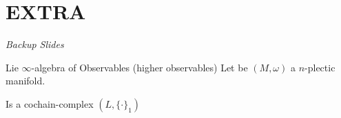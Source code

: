 \documentclass[handout,10pt]{beamer}
\begin{document}


\appendix
\section{EXTRA}
\begin{frame}
	\begin{center}
	\Huge\emph{Backup Slides}
	\end{center}
\end{frame}
\addtocounter{framenumber}{-1}



\begin{frame}[fragile]{Lie $\infty$-algebra of Observables (higher observables) }
	Let be $(M,\omega)$ a $n$-plectic manifold.
	  	\vfill
	\begin{defblock}
		\medskip
		\hspace{.25em} Is a cochain-complex $(L,\{\cdot\}_1)$ \\
		\vspace{-1em}
		\begin{center}
			
		\end{center}
	\end{defblock}
  \end{frame}
\end{document}
